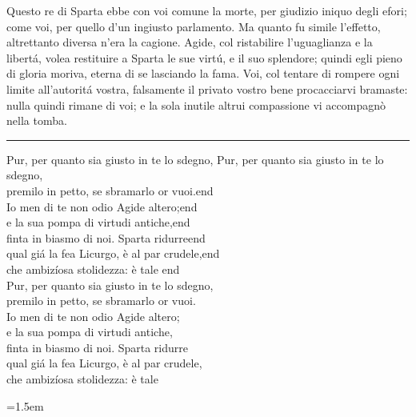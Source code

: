 \documentclass[a5paper,11pt]{book}
\def\testodicontrollo{%
Questo re di Sparta ebbe con voi comune la morte, per giudizio
iniquo degli efori; come voi, per quello d'un ingiusto parlamento.
Ma quanto fu simile l'effetto, altrettanto diversa n'era la
cagione. Agide, col ristabilire l'uguaglianza e la libertá, volea
restituire a Sparta le sue virtú, e il suo splendore; quindi egli
pieno di gloria moriva, eterna di se lasciando la fama. Voi, col
tentare di rompere ogni limite all'autoritá vostra, falsamente il
privato vostro bene procacciarvi bramaste: nulla quindi rimane di
voi; e la sola inutile altrui compassione vi accompagnò nella
tomba.
}
\begin{document}
\shorthandoff{>}
\actname

\testodicontrollo

\noindent\rule{\leftmargini}{1pt}

\begin{versedrama}
  Pur, per quanto sia giusto in te lo sdegno, Pur, per quanto sia giusto in te lo sdegno,\\
  premilo in petto, se sbramarlo or vuoi.end\\
  Io men di te non odio Agide altero;end\\
  e la sua pompa di virtudi antiche,end\\
  finta in biasmo di noi. Sparta ridurreend\\
  qual giá la fea Licurgo, è al par crudele,end\\
  che ambizíosa stolidezza: è tale\hspace{0pt plus 1filll} end\\
  Pur, per quanto sia giusto in te lo sdegno,\\
  premilo in petto, se sbramarlo or vuoi.\\
  Io men di te non odio Agide altero;\\
  e la sua pompa di virtudi antiche,\\
  finta in biasmo di noi. Sparta ridurre\\
  qual giá la fea Licurgo, è al par crudele,\\
  che ambizíosa stolidezza: è tale\\
\end{versedrama}

\leftmargini=1.5em
\end{document}
